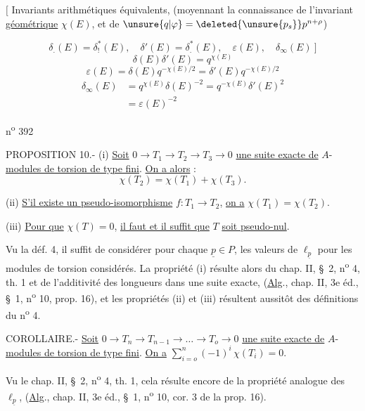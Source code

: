 $\bigl[$ Invariants arithmétiques équivalents, (moyennant la connaissance de l'invariant \uline{géométrique} $\chi(E)$, et de $\unsure{q|\varphi}=\deleted{\unsure{p_s}}p^{n+\rho}$)

\[
\delta_{.}(E)=\delta_!^*(E),\quad \delta'(E)=\delta_{.}^*(E),\quad \varepsilon(E),\quad \delta_\infty(E)\ \biggr]
\]
\[
\boxed{\delta(E)\delta'(E)=q^{\chi(E)}}
\]
\[
\boxed{\varepsilon(E)=\delta(E)q^{-\chi(E)/2}=\delta'(E)q^{-\chi(E)/2}}
\]
\[
\boxed{\begin{aligned}
\delta_\infty(E)&=q^{\chi(E)}\delta(E)^{-2}=q^{-\chi(E)}\delta'(E)^2\\
&=\varepsilon(E)^{-2}
\end{aligned}}
\]

n\textsuperscript{o} 392

PROPOSITION 10.- (i) \uline{Soit} $0\longrightarrow T_1\longrightarrow T_2\longrightarrow T_3\longrightarrow 0$ \uline{une suite exacte de} $A$-\uline{modules de torsion de type fini}. \uline{On a alors} :
\[
\chi(T_2)=\chi(T_1)+\chi(T_3).
\]

(ii) \quad \uline{S'il existe un pseudo-isomorphisme} $f:T_1\longrightarrow T_2$, \uline{on a} $\chi(T_1)=\chi(T_2)$.

(iii) \uline{Pour que} $\chi(T)=0$, \uline{il faut et il suffit que} $T$ \uline{soit pseudo-nul}.

Vu la déf. 4, il suffit de considérer pour chaque $\underline p\in P$, les valeurs de $\ell_{\underline p}$ pour les modules de torsion considérés. La propriété (i) résulte alors du chap. II, \S~2, n\textsuperscript{o} 4, th. 1 et de l'additivité des longueurs dans une suite exacte, (\uline{Alg}., chap. II, 3e éd., \S~1, n\textsuperscript{o} 10, prop. 16), et les propriétés (ii) et (iii) résultent aussitôt des définitions du n\textsuperscript{o} 4.

COROLLAIRE.- \uline{Soit} $0\longrightarrow T_n\longrightarrow T_{n-1}\longrightarrow\ldots\longrightarrow T_o\longrightarrow 0$ \uline{une suite exacte de} $A$-\uline{modules de torsion de type fini}. \uline{On a} $\displaystyle\sum_{i=o}^{n}(-1)^i\,\chi(T_i)=0$.

Vu le chap. II, \S~2, n\textsuperscript{o} 4, th. 1, cela résulte encore de la propriété analogue des $\ell_{\underline p}$, (\uline{Alg}., chap. II, 3e éd., \S~1, n\textsuperscript{o} 10, cor. 3 de la prop. 16).

